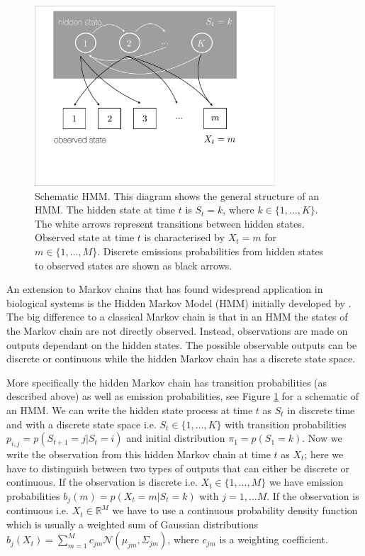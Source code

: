 \begin{figure}[!t]
\centering
\includegraphics[width=0.8\textwidth]{pics/hmm-schem.pdf}
\caption{Schematic HMM. This diagram shows the general structure of an HMM. The hidden state at time $t$ is $S_t=k$, where $k \in \{1, \ldots, K\}$. The white arrows represent transitions between hidden states. Observed state at time $t$ is characterised by $X_t =m $ for $m \in \{1, \ldots, M\}$. Discrete emissions probabilities from hidden states to observed states are shown as black arrows.}
\label{fig:hmm-schem}
\end{figure}

An extension to Markov chains that has found widespread application in biological systems is the Hidden Markov Model (HMM)  initially developed by \cite{Baum:1966cy}. The big difference to a classical Markov chain is that in an HMM the states of the Markov chain are not directly observed. Instead, observations are made on outputs dependant on the hidden states. The possible observable outputs can be discrete or continuous while the hidden Markov chain has a discrete state space.

More specifically the hidden Markov chain has transition probabilities (as described above) as well as emission probabilities, see Figure \ref{fig:hmm-schem} for a schematic of an HMM. We can write the hidden state process at time $t$ as $S_t$ in discrete time and with a discrete state space i.e. $S_t \in \lbrace 1, \ldots, K \rbrace$ with transition probabilities $p_{i,j} = p(S_{t+1} =j | S_t =i)$ and initial distribution $\pi_1 = p(S_1 = k)$. Now we write the observation from this hidden Markov chain at time $t$ as $X_t$; here we have to distinguish between two types of outputs that can either be discrete or continuous. If the observation is discrete i.e. $X_t \in \lbrace 1, \ldots, M \rbrace$ we have emission probabilities  $b_j(m) = p(X_t = m | S_t = k)$ with $j = 1, \ldots M$. If the observation is continuous i.e. $X_t \in \mathbb{R}^M$ we have to use a continuous probability density function which is usually a weighted sum of Gaussian distributions $b_j(X_t) = \sum_{m=1}^M c_{jm}\mathcal{N}(\mu_{jm}, \Sigma_{jm})$, where $c_{jm}$ is a weighting coefficient.

